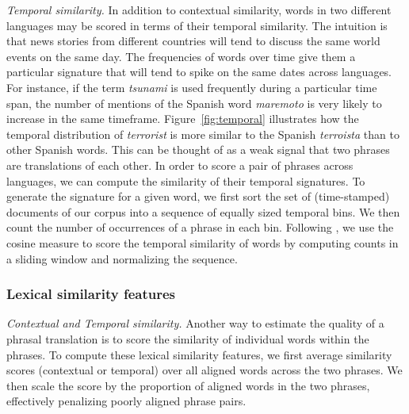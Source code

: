 \documentclass[11pt]{article}
\newcommand{\mnote}[1]{\marginpar{%
  \vskip-\baselineskip
  \raggedright\footnotesize
  \itshape\hrule\smallskip\tiny{#1}\par\smallskip\hrule}}
\newcommand{\mtodo}[1]{\mnote{\textcolor{red}{#1}}}
\newcommand{\figref}[1]{Figure~\ref{#1}}
\newcommand{\paraheader}[1]{\vskip 0.05in \noindent\emph{#1}}
\begin{document}
\paraheader{Temporal similarity.} In addition to contextual similarity, words in two different languages may be scored in terms of their temporal similarity.  The intuition is that news stories from different countries will tend to discuss the same world events on the same day.  The frequencies of words over time give them a particular signature that will tend to spike on the same dates across languages.  For instance, if the term {\it tsunami} is used frequently during a particular time span, the number of mentions of the Spanish word {\it maremoto} is very likely to increase in the same timeframe. \figref{fig:temporal} illustrates how the temporal distribution of {\it terrorist} is more similar to the Spanish {\it terroista} than to other Spanish words.  This can be thought of as a weak signal that two phrases are translations of each other.  In order to score a pair of phrases across languages, we can compute the similarity of their temporal signatures. To generate the signature for a given word, we first sort the set of (time-stamped) documents of our corpus into a sequence of equally sized temporal bins.  We then count the number of occurrences of a phrase in each bin.  Following , we use the cosine measure to score the temporal similarity of words by computing counts in a sliding window and normalizing the sequence. \nocite{alfonseca-ciaramita-hall:2009:EMNLP}



\subsubsection{Lexical similarity features}  \label{sect:lexfeats}

\paraheader{Contextual and Temporal similarity.}  Another way to estimate the quality of a phrasal translation is to score the similarity of individual words within the phrases.  To compute these lexical similarity features, we first average similarity scores (contextual or temporal) over all aligned words across the two phrases.  We then scale the score by the proportion of aligned words in the two phrases, effectively penalizing poorly aligned phrase pairs.\mtodo{Mention that it is the average of both forward and backward alignments?}
\end{document}
